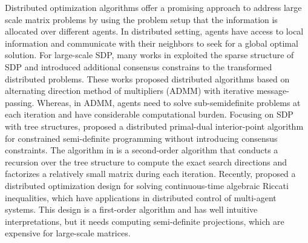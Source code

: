 \documentclass[journal]{IEEEtran}
\newcommand{\upcite}[1]{\textsuperscript{\textsuperscript{\cite{#1}}}}
\begin{document}
\par Distributed optimization algorithms offer a promising approach to address large scale matrix problems by using the problem setup that the information is allocated over different agents\upcite{Sylvester_matrix,linear_eq,Deng2019NetworkFT,2016Implementing,matrix_equation,Lyapunov_matrix,Hong2016}. In distributed setting, agents have access to local information and communicate with their neighbors to seek for a global optimal solution\upcite{consensus_shi,liang_opti,Wang2020}. For large-scale SDP, many works in \cite{smart_admm,ADMM_CDC,fast_dis,semi_power,asyn_admm}  exploited the sparse structure of SDP and introduced additional consensus constrains to the transformed distributed problems. These works proposed distributed algorithms based on alternating direction method of multipliers (ADMM) with iterative message-passing.  Whereas, in ADMM, agents need to solve sub-semidefinite problems at each iteration and have considerable computational burden. Focusing on SDP with tree structures, \cite{dis_pd} proposed a distributed primal-dual interior-point algorithm for constrained semi-definite programming without introducing consensus constraints. The algorithm in \cite{dis_pd} is a second-order algorithm that conducts a recursion over the tree structure to compute the exact search directions and factorizes a relatively small matrix during each iteration. Recently, \cite{ricatti_zeng} proposed a distributed optimization design for solving continuous-time algebraic Riccati inequalities, which have applications in distributed control of multi-agent systems. This design is a first-order algorithm and has well intuitive interpretations, but it needs computing semi-definite projections, which are expensive for large-scale matrices.  








\end{document}
